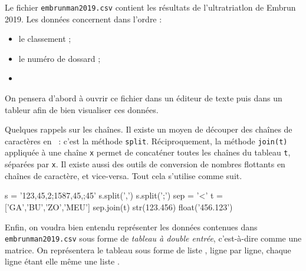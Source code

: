 Le fichier \texttt{embrunman2019.csv} contient les résultats de l'ultratriatlon de Embrun 2019. Les données concernent dans l'ordre :
\begin{itemize}
  \item le classement  ;
  \item le numéro de dossard ;
  \item
\end{itemize}

On pensera d'abord à ouvrir ce fichier dans un éditeur de texte puis dans un tableur afin de bien visualiser ces données. 



Quelques rappels sur les chaînes. Il existe un moyen de \og découper \fg{} des chaînes de caractères en \python\ : c'est la méthode \texttt{split}. 
Réciproquement, la méthode \texttt{join(t)} appliquée à une chaîne \texttt{x} permet de concaténer toutes les chaînes du tableau \texttt{t}, séparées par \texttt{x}.
Il existe aussi des outils de conversion de nombres flottants en chaînes de caractère, et vice-versa.
Tout cela s'utilise comme suit.

\begin{pyconsole}
s = '123,45,2;1587,45,;45'
s.split(',')
s.split(';')
sep = '<'
t = ['GA','BU','ZO','MEU']
sep.join(t)
str(123.456)
float('456.123')
\end{pyconsole}

Enfin, on voudra bien entendu représenter les données contenues dans \texttt{embrunman2019.csv} sous forme de \emph{tableau à double entrée}, c'est-à-dire comme une matrice. On représentera le tableau sous forme de liste \python, ligne par ligne, chaque ligne étant elle même une liste \python.

